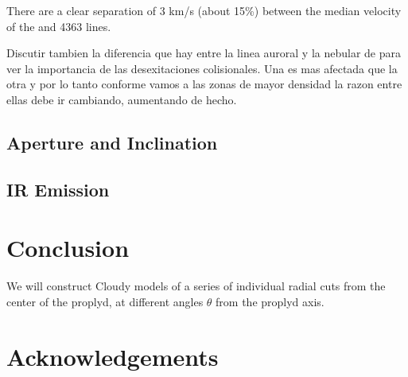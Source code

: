 \documentclass[useAMS,usenatbib]{mn2e}
\begin{document}
There are a clear separation of 3 km/s (about 15\%) between the median velocity of the  and 4363 lines.

Discutir tambien la diferencia que hay entre la linea auroral y la nebular de \nii para ver la importancia de las desexitaciones colisionales. Una es mas afectada que la otra y por lo tanto conforme vamos a las zonas de mayor densidad la razon entre ellas debe ir cambiando, aumentando de hecho.

\subsection{Aperture and Inclination}
\label{sec:aperture}


\subsection{IR Emission}
\label{sec:IR}


\section{Conclusion}
\label{sec:conclusions}

We will construct Cloudy models of a series of individual radial cuts from the center of the proplyd, at different angles $\theta$ from the proplyd axis.

\section{Acknowledgements}
\label{sec:Acknowledgements}




\end{document}
